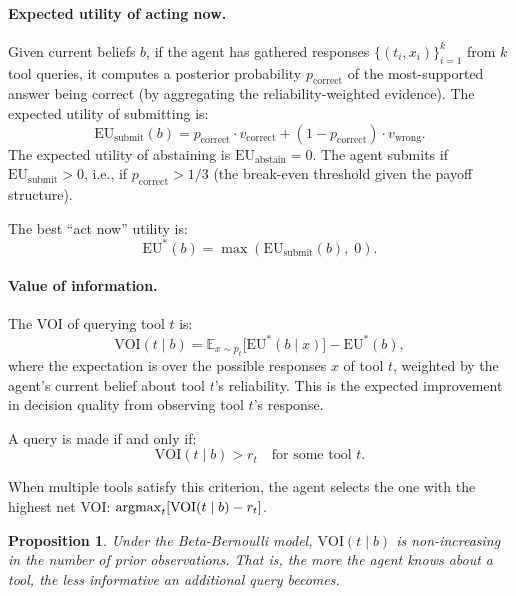 \documentclass[11pt]{article}
\newcommand{\EU}{\mathrm{EU}}
\newcommand{\VOI}{\mathrm{VOI}}
\newcommand{\E}{\mathbb{E}}
\newcommand{\argmax}{\operatornamewithlimits{argmax}}
\newtheorem{proposition}{Proposition}
\begin{document}
\paragraph{Expected utility of acting now.}
Given current beliefs $b$, if the agent has gathered responses $\{(t_i, x_i)\}_{i=1}^k$ from $k$ tool queries, it computes a posterior probability $p_{\text{correct}}$ of the most-supported answer being correct (by aggregating the reliability-weighted evidence). The expected utility of submitting is:
\begin{equation}
  \EU_{\text{submit}}(b) = p_{\text{correct}} \cdot v_{\text{correct}} + (1 - p_{\text{correct}}) \cdot v_{\text{wrong}}.
\end{equation}
The expected utility of abstaining is $\EU_{\text{abstain}} = 0$. The agent submits if $\EU_{\text{submit}} > 0$, i.e., if $p_{\text{correct}} > 1/3$ (the break-even threshold given the payoff structure).

The best ``act now'' utility is:
\begin{equation}
  \EU^*(b) = \max(\EU_{\text{submit}}(b),\; 0).
\end{equation}

\paragraph{Value of information.}
The VOI of querying tool $t$ is:
\begin{equation}
  \VOI(t \mid b) = \E_{x \sim p_t}\!\bigl[\EU^*(b \mid x)\bigr] - \EU^*(b),
  \label{eq:voi}
\end{equation}
where the expectation is over the possible responses $x$ of tool $t$, weighted by the agent's current belief about tool $t$'s reliability. This is the expected improvement in decision quality from observing tool $t$'s response.

A query is made if and only if:
\begin{equation}
  \VOI(t \mid b) > r_t \quad \text{for some tool } t.
  \label{eq:query_criterion}
\end{equation}

When multiple tools satisfy this criterion, the agent selects the one with the highest net VOI: $\argmax_t [\VOI(t \mid b) - r_t]$.

\begin{proposition}
\label{prop:voi_decrease}
Under the Beta-Bernoulli model, $\VOI(t \mid b)$ is non-increasing in the number of prior observations. That is, the more the agent knows about a tool, the less informative an additional query becomes.
\end{proposition}
\end{document}
